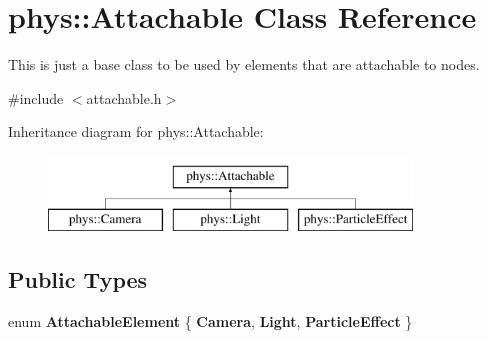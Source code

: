 \hypertarget{classphys_1_1Attachable}{
\section{phys::Attachable Class Reference}
\label{df/dbd/classphys_1_1Attachable}
}


This is just a base class to be used by elements that are attachable to nodes.  




{\ttfamily \#include $<$attachable.h$>$}

Inheritance diagram for phys::Attachable:\begin{figure}[H]
\begin{center}
\leavevmode
\includegraphics[height=2cm]{df/dbd/classphys_1_1Attachable}
\end{center}
\end{figure}
\subsection*{Public Types}
\begin{DoxyCompactItemize}
\item 
enum {\bfseries AttachableElement} \{ {\bfseries Camera}, 
{\bfseries Light}, 
{\bfseries ParticleEffect}
 \}
\end{DoxyCompactItemize}
